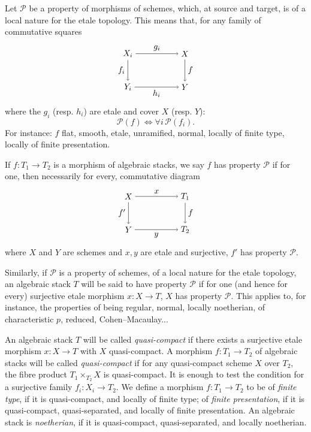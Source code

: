 \documentclass[10pt]{article}
\begin{document}
Let $\mathcal P$ be a property of morphisms of schemes, which, at source and target, is of a local nature for the etale topology. This means that, for any family of commutative squares
\[
\begin{tikzpicture}[baseline=(current bounding box.center), node distance=1.6cm]
\node (Xi) at (0,1.4) {$X_i$};
\node (X) at (2.4,1.4) {$X$};
\node (Yi) at (0,0) {$Y_i$};
\node (Y) at (2.4,0) {$Y$};
\draw[->] (Xi) -- node[above] {$g_i$} (X);
\draw[->] (Xi) -- node[left] {$f_i$} (Yi);
\draw[->] (X) -- node[right] {$f$} (Y);
\draw[->] (Yi) -- node[below] {$h_i$} (Y);
\end{tikzpicture}
\]
where the $g_i$ (resp. $h_i$) are etale and cover $X$ (resp. $Y$):
\[
\mathcal P(f)\Longleftrightarrow \forall i\,\mathcal P(f_i).
\]
For instance: $f$ flat, smooth, etale, unramified, normal, locally of finite type, locally of finite presentation.

If $f:T_1\to T_2$ is a morphism of algebraic stacks, we say $f$ has property $\mathcal P$ if for one, then necessarily for every, commutative diagram
\[
\begin{tikzpicture}[baseline=(current bounding box.center)]
\node (X) at (0,1.4) {$X$};
\node (T1) at (2.4,1.4) {$T_1$};
\node (Y) at (0,0) {$Y$};
\node (T2) at (2.4,0) {$T_2$};
\draw[->] (X) -- node[above] {$x$} (T1);
\draw[->] (X) -- node[left] {$f'$} (Y);
\draw[->] (T1) -- node[right] {$f$} (T2);
\draw[->] (Y) -- node[below] {$y$} (T2);
\end{tikzpicture}
\]
where $X$ and $Y$ are schemes and $x,y$ are etale and surjective, $f'$ has property $\mathcal P$.

Similarly, if $\mathcal P$ is a property of schemes, of a local nature for the etale topology, an algebraic stack $T$ will be said to have property $\mathcal P$ if for one (and hence for every) surjective etale morphism $x:X\to T$, $X$ has property $\mathcal P$. This applies to, for instance, the properties of being regular, normal, locally noetherian, of characteristic $p$, reduced, Cohen--Macaulay...

An algebraic stack $T$ will be called \emph{quasi-compact} if there exists a surjective etale morphism $x:X\to T$ with $X$ quasi-compact. A morphism $f:T_1\to T_2$ of algebraic stacks will be called \emph{quasi-compact} if for any quasi-compact scheme $X$ over $T_2$, the fibre product $T_1\times_{T_2}X$ is quasi-compact. It is enough to test the condition for a surjective family $f_i:X_i\to T_2$. We define a morphism $f:T_1\to T_2$ to be of \emph{finite type}, if it is quasi-compact, and locally of finite type; of \emph{finite presentation}, if it is quasi-compact, quasi-separated, and locally of finite presentation. An algebraic stack is \emph{noetherian}, if it is quasi-compact, quasi-separated, and locally noetherian.
\end{document}
